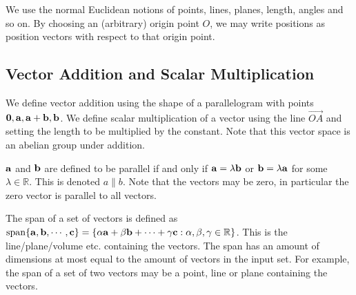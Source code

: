 We use the normal Euclidean notions of points, lines, planes, length, angles and so on. By choosing an (arbitrary) origin point $O$, we may write positions as position vectors with respect to that origin point.

\subsection{Vector Addition and Scalar Multiplication}
We define vector addition using the shape of a parallelogram with points $\vb 0, \vb a, \vb a + \vb b, \vb b$. We define scalar multiplication of a vector using the line $\overrightarrow{OA}$ and setting the length to be multiplied by the constant. Note that this vector space is an abelian group under addition.
\begin{definition}
	$\vb a$ and $\vb b$ are defined to be parallel if and only if $\vb a = \lambda \vb b$ or $\vb b = \lambda \vb a$ for some $\lambda \in \mathbb R$. This is denoted $a \parallel b$. Note that the vectors may be zero, in particular the zero vector is parallel to all vectors.
\end{definition}
\begin{definition}
	The span of a set of vectors is defined as $\operatorname{span} \{\vb a, \vb b, \cdots, \vb c\} = \{ \alpha \vb a + \beta \vb b + \cdots + \gamma \vb c: \alpha, \beta, \gamma \in \mathbb R \}$. This is the line/plane/volume etc. containing the vectors. The span has an amount of dimensions at most equal to the amount of vectors in the input set. For example, the span of a set of two vectors may be a point, line or plane containing the vectors.
\end{definition}


